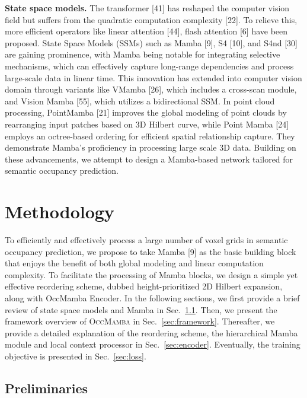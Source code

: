 \documentclass[10pt,twocolumn,letterpaper]{article}
\newcommand{\methodname}{\textsc{OccMamba}}
\begin{document}
\textbf{State space models.}
The transformer [41] has reshaped the computer vision field but suffers from the quadratic computation complexity [22]. To relieve this, more efficient operators like linear attention [44], flash attention [6] have been proposed. State Space Models (SSMs) such as Mamba [9], S4 [10], and S4nd [30] are gaining prominence, with Mamba being notable for integrating selective mechanisms, which can effectively capture long-range dependencies and process large-scale data in linear time. This innovation has extended into computer vision domain through variants like VMamba [26], which includes a cross-scan module, and Vision Mamba [55], which utilizes a bidirectional SSM. In point cloud processing, PointMamba [21] improves the global modeling of point clouds by rearranging input patches based on 3D Hilbert curve, while Point Mamba [24] employs an octree-based ordering for efficient spatial relationship capture. They demonstrate Mamba's proficiency in processing large scale 3D data. Building on these advancements, we attempt to design a Mamba-based network tailored for semantic occupancy prediction.


\section{Methodology}

To efficiently and effectively process a large number of voxel grids in semantic occupancy prediction, we propose to take Mamba [9] as the basic building block that enjoys the benefit of both global modeling and linear computation complexity. To facilitate the processing of Mamba blocks, we design a simple yet effective reordering scheme, dubbed height-prioritized 2D Hilbert expansion, along with OccMamba Encoder. In the following sections, we first provide a brief review of state space models and Mamba in Sec.~\ref{sec:prelim}. Then, we present the framework overview of \methodname{} in Sec.~\ref{sec:framework}. Thereafter, we provide a detailed explanation of the reordering scheme, the hierarchical Mamba module and local context processor in Sec.~\ref{sec:encoder}. Eventually, the training objective is presented in Sec.~\ref{sec:loss}.

\subsection{Preliminaries}
\label{sec:prelim}
\end{document}
